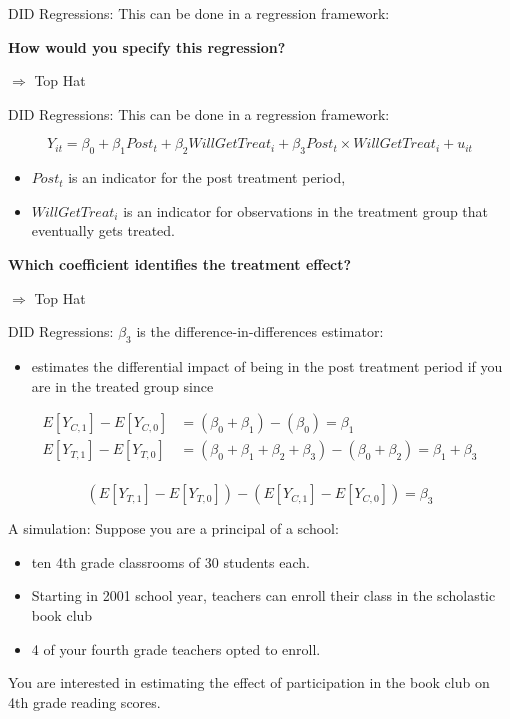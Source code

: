 \documentclass[
  ignorenonframetext,
]{beamer}
\providecommand{\tightlist}{%
  \setlength{\itemsep}{0pt}\setlength{\parskip}{0pt}}
\begin{document}
\begin{frame}{DID Regressions:}
\protect\hypertarget{did-regressions}{}
This can be done in a regression framework:

\textbf{How would you specify this regression?}

\(\Rightarrow\) Top Hat
\end{frame}

\begin{frame}{DID Regressions:}
\protect\hypertarget{did-regressions-1}{}
This can be done in a regression framework:

\[
Y_{it}=\beta_0+\beta_1 Post_t+\beta_2 WillGetTreat_i+\beta_3 Post_t\times WillGetTreat_i+u_{it}
\]

\begin{itemize}
\item
  \(Post_t\) is an indicator for the post treatment period,
\item
  \(WillGetTreat_i\) is an indicator for observations in the treatment
  group that eventually gets treated.
\end{itemize}

\textbf{Which coefficient identifies the treatment effect?}

\(\Rightarrow\) Top Hat
\end{frame}

\begin{frame}{DID Regressions:}
\protect\hypertarget{did-regressions-2}{}
\(\beta_3\) is the difference-in-differences estimator:

\begin{itemize}
\tightlist
\item
  estimates the differential impact of being in the post treatment
  period if you are in the treated group since
\end{itemize}

\small

\[
\begin{aligned}
E[Y_{C,1}]-E[Y_{C,0}]&=(\beta_0+\beta_1)-(\beta_0)=\beta_1\\
E[Y_{T,1}]-E[Y_{T,0}]&=(\beta_0+\beta_1+\beta_2+\beta_3)-(\beta_0+\beta_2)=\beta_1+\beta_3\\
\end{aligned}
\]

\[
(E[Y_{T,1}]-E[Y_{T,0}])-(E[Y_{C,1}]-E[Y_{C,0}])=\beta_3
\]
\end{frame}

\begin{frame}{A simulation:}
\protect\hypertarget{a-simulation}{}
Suppose you are a principal of a school:

\begin{itemize}
\item
  ten 4th grade classrooms of 30 students each.
\item
  Starting in 2001 school year, teachers can enroll their class in the
  scholastic book club
\item
  4 of your fourth grade teachers opted to enroll.
\end{itemize}

You are interested in estimating the effect of participation in the book
club on 4th grade reading scores.
\end{frame}
\end{document}
